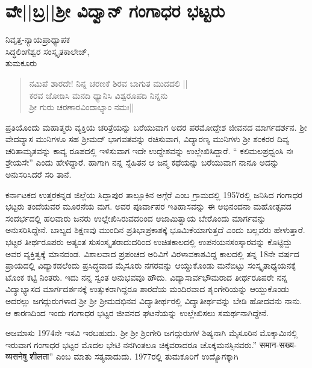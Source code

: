 \chapter{ವೇ||ಬ್ರ||ಶ್ರೀ ವಿದ್ವಾನ್ ಗಂಗಾಧರ ಭಟ್ಟರು}

\begin{center}
\smallskip
ನಿವೃತ್ತ-ನ್ಯಾಯಪ್ರಾಧ್ಯಾಪಕ\\
ಸಿದ್ಧಲಿಂಗೆಶ್ವರ ಸಂಸ್ಕೃತಕಾಲೇಜ್,\\
ತುಮಕೂರು
\end{center}
\begin{verse}
ನಮಿಪೆ ಶಾರದೇ! ನಿನ್ನ ಚರಣಕೆ ಶಿರವ ಬಾಗುತ ಮುದದಲಿ ||\\
ಕರವ ಜೋಡಿಸಿ ಮನದಿ ಧ್ಯಾನಿಸಿ ವಿಶ್ವರೂಪದಿ ನಿನ್ನನು\\
ಶ್ರೀ ಗುರು ಚರಣಾರವಿಂದಾಭ್ಯಾಂ ನಮಃ||
\end{verse}

ಪ್ರತಿಯೊಂದು ಮಹಾತ್ಮರು ವ್ಯಕ್ತಿಯ ಚರಿತ್ರೆಯನ್ನು ಬರೆಯುವಾಗ ಅದರ ಪರಮೋದ್ದೇಶ ಜೀವನದ ಮಾರ್ಗದರ್ಶನ. ಶ್ರೀ ವೇದವ್ಯಾಸ ಮುನಿಗಳೂ ಸಹ ಶ್ರೀಮದ್ ಭಾಗವತವನ್ನು ರಚಿಸುವಾಗ, ವಿದ್ಯಾರಣ್ಯ ಮುನಿಗಳು ಶ್ರೀ ಶಂಕರರ ದಿವ್ಯ ಚರಿತಾಮೃತವನ್ನು ಕಾವ್ಯ ರೂಪದಲ್ಲಿ ಇಳಿಸುವಾಗ ಇದೇ ಉದ್ದೇಶವನ್ನು ಉಲ್ಲೇಖಿಸಿದ್ದಾರೆ. “ ಕಲಿಮಲಪ್ರಧ್ವಂಸಿ ನಃ ಶ್ರೇಯಸೇ” ಎಂದು ಹೇಳಿದ್ದಾರೆ. ಹಾಗಾಗಿ ನನ್ನ ಸ್ನೆಹಿತನ ಆ ಜನ್ಮ ಕಥೆಯನ್ನು ಬರೆಯುವಾಗ ನಾನೂ ಅದನ್ನು ಅನುಸರಿಸಿದರೆ ಸರಿ ತಾನೆ.

ಕರ್ನಾಟಕದ ಉತ್ತರಕನ್ನಡ ಜಿಲ್ಲೆಯ ಸಿದ್ದಾಪುರ ತಾಲ್ಲೂಕಿನ ಅಗ್ಗೆರೆ ಎಂಬ ಗ್ರಾಮದಲ್ಲಿ 1957ರಲ್ಲಿ ಜನಿಸಿದ ಗಂಗಾಧರ ಭಟ್ಟರು ತಂದೆಯವರ ಮೂರನೆಯ ಮಗ. ಅವರ ಪೂರ್ವಾಪರ ಇತಿಹಾಸವನ್ನು ಈ ಅಭಿನಂದನಾ ಮಹೋತ್ಸವದ ಸಂದರ್ಭದಲ್ಲಿ  ಹಲವಾರು ಜನರು ಉಲ್ಲೇಖಿಸಿರುವದರಿಂದ ಅಜಾಮಿತ್ವಾಯ ಬೇರೊಂದು ಮಾರ್ಗವನ್ನು ಅನುಸರಿಸಿದ್ದೇನೆ. ಬಾಲ್ಯದ ಶಿಕ್ಷಣವು ಮುಂದಿನ ಪ್ರತಿಭಾಪ್ರಕಾಶಕ್ಕೆ ಭೂಮಿಕೆಯಾಗುತ್ತದೆ ಎಂದು ಬಲ್ಲವರು ಹೇಳುತ್ತಾರೆ. ಭಟ್ಟರ ತೀರ್ಥರೂಪರು ಅತ್ಯಂತ ಸುಸಂಸ್ಕೃತರಾದುದರಿಂದ ಉಚಿತಕಾಲದಲ್ಲಿ ಉಪನಯನಸಂಸ್ಕಾರವನ್ನು ಕೊಟ್ಟಿದ್ದು ಅವರ ವ್ಯಕ್ತಿತ್ವಕ್ಕೆ ಮಾನದಂಡ. ವಿಶಾಲವಾದ ಪ್ರಪಂಚದ ಅರಿವಿಗೆ ವಿರಳಾವಕಾಶವಿದ್ದ ಕಾಲದಲ್ಲಿ ತನ್ನ 18ನೇ ವರ್ಷದ ಪ್ರಾಯದಲ್ಲಿ ವಿದ್ಯಾಕಡಲೆಂದು ಪ್ರಸಿದ್ಧವಾದ ಮೈಸೂರು ನಗರವನ್ನು ಆಯ್ದುಕೊಂಡು ಮನೆಬಿಟ್ಟು ಸಂಸ್ಕೃತಾಧ್ಯಯನಕ್ಕೆ ಟೊಂಕ ಕಟ್ಟಿ ನಿಂತರು. ಇದು ನನ್ನ ಸ್ವಂತ ಅನುಭವವೂ ಹೌದು. ವಿದ್ಯಾಸಾರ್ವಭೌಮರಾದ ತೀರ್ಥರೂಪರೇ ನನ್ನ ವಿದ್ಯಾಭ್ಯಾಸದ ಮಾರ್ಗದರ್ಶನಕ್ಕೆ ಉತ್ಸುಕರಾಗಿದ್ದರೂ ಶಾರದೆಯ ಮಂದಿರವಾದ ಶೃಂಗೇರಿಯನ್ನು ಆಯ್ದುಕೊಂಡು ಅದರಲ್ಲು ಜಗದ್ಗುರುಗಳಾದ ಶ್ರೀ ಶ್ರೀ ಶ್ರೀಮದಭಿನವ ವಿದ್ಯಾತೀರ್ಥರಲ್ಲಿ ವಿದ್ಯಾತೀರ್ಥವನ್ನು ಬೇಡಿ ಹೋದವನು ನಾನು. ಆ ಕಾರಣದಿಂದ ಇಂದು ಗಂಗಾಧರ ಭಟ್ಟರ ಜೀವನದ ಘಟನೆಯನ್ನು ಉಲ್ಲೇಖಿಸಲು ಸಮರ್ಥನಾಗಿದ್ದೇನೆ.

ಅಜಮಾಸು 1974ನೇ ಇಸವಿ ಇರಬಹುದು. ಶ್ರೀ ಶ್ರೀ ಶ್ರಿಂಗೇರಿ ಜಗದ್ಗುರುಗಳ ಶಿಷ್ಯನಾಗಿ ಮೈಸೂರಿನ ಮೊಕ್ಕಾಮಿನಲ್ಲಿ ಇರುವಾಗ ಗಂಗಾಧರ ಭಟ್ಟರ ಮೊದಲ ಭೇಟಿ ನನಗಿಂತಲೂ ಚಿಕ್ಕವರಾದರೂ ಚೊಕ್ಕಮನಸ್ಸಿನವರು.” समान-सख्य-व्यसनेषु शीलता” ಎಂಬ ಮಾತು ಸತ್ಯವಾದುದು. 1977ರಲ್ಲಿ ತುಮಕೂರಿಗೆ ಉದ್ಯೊಗಕ್ಕಾಗಿ

